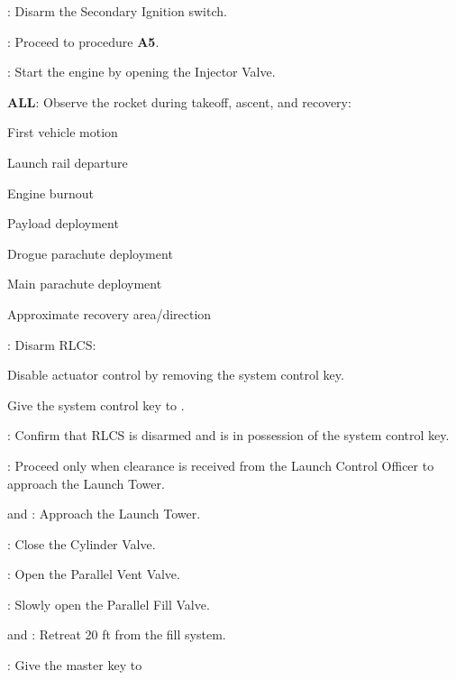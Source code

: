 \begin{checklist}
\begin{checklist}
\begin{checklist}[label=$\bullet$]
            \begin{checklist}
                \item \primary: Disarm the Secondary Ignition switch.
                \item \ops: Proceed to procedure \textbf{A5}.
            \end{checklist}
        \end{checklist}
        \item \primary: Start the engine by opening the Injector Valve.
    \end{checklist}
    \item \textbf{ALL}: Observe the rocket during takeoff, ascent, and recovery:
    \begin{checklist}
        \item First vehicle motion
        \item Launch rail departure
        \item Engine burnout
        \item Payload deployment
        \item Drogue parachute deployment
        \item Main parachute deployment
        \item Approximate recovery area/direction
    \end{checklist}
    \item \control{}: Disarm RLCS:
    \begin{checklist}
        \item Disable actuator control by removing the system control key.
        \item Give the system control  key to \ops{}.
    \end{checklist}
    \item \ops: Confirm that RLCS is disarmed and \ops{} is in possession of the system control  key.
    \item \ops{}: Proceed only when clearance is received from the Launch Control Officer to approach the Launch Tower.
    \item \primary{} and \secondary: Approach the Launch Tower.
    \item \primary{}: Close the Cylinder Valve.
    \item \primary{}: Open the Parallel Vent Valve.
    \item \primary{}: Slowly open the Parallel Fill Valve.
    \item \primary{} and \secondary: Retreat 20 ft from the fill system.
    \item \ops: Give the master key to \control{}

\end{checklist}
